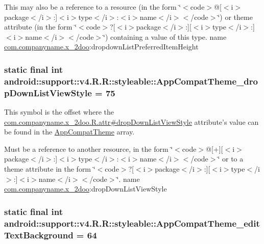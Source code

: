This may also be a reference to a resource (in the form \char`\"{}$<$code$>$@\mbox{[}$<$i$>$package$<$/i$>$:\mbox{]}$<$i$>$type$<$/i$>$:$<$i$>$name$<$/i$>$$<$/code$>$\char`\"{}) or theme attribute (in the form \char`\"{}$<$code$>$?\mbox{[}$<$i$>$package$<$/i$>$:\mbox{]}\mbox{[}$<$i$>$type$<$/i$>$:\mbox{]}$<$i$>$name$<$/i$>$$<$/code$>$\char`\"{}) containing a value of this type.  name \hyperlink{namespacecom_1_1companyname_1_1x__2doo}{com.companyname.x\_\-2doo}:dropdownListPreferredItemHeight \hypertarget{classandroid_1_1support_1_1v4_1_1_r_1_1styleable_7f77b4643b5ac4aa9e62aa4fc9232548}{
\subsubsection[{AppCompatTheme\_\-dropDownListViewStyle}]{\setlength{\rightskip}{0pt plus 5cm}static final int android::support::v4.R.R::styleable::AppCompatTheme\_\-dropDownListViewStyle = 75}}
\label{classandroid_1_1support_1_1v4_1_1_r_1_1styleable_7f77b4643b5ac4aa9e62aa4fc9232548}


This symbol is the offset where the \hyperlink{classcom_1_1companyname_1_1x__2doo_1_1_r_1_1attr_4af8075c171aece6c5ba9ce03299d157}{com.companyname.x\_\-2doo.R.attr\#dropDownListViewStyle} attribute's value can be found in the \hyperlink{classandroid_1_1support_1_1v4_1_1_r_1_1styleable_0873e92ba21076bb5a4aeadeb7f5779f}{AppCompatTheme} array.

Must be a reference to another resource, in the form \char`\"{}$<$code$>$@\mbox{[}+\mbox{]}\mbox{[}$<$i$>$package$<$/i$>$:\mbox{]}$<$i$>$type$<$/i$>$:$<$i$>$name$<$/i$>$$<$/code$>$\char`\"{} or to a theme attribute in the form \char`\"{}$<$code$>$?\mbox{[}$<$i$>$package$<$/i$>$:\mbox{]}\mbox{[}$<$i$>$type$<$/i$>$:\mbox{]}$<$i$>$name$<$/i$>$$<$/code$>$\char`\"{}.  name \hyperlink{namespacecom_1_1companyname_1_1x__2doo}{com.companyname.x\_\-2doo}:dropDownListViewStyle \hypertarget{classandroid_1_1support_1_1v4_1_1_r_1_1styleable_1e59b88c396599d1ced4caa57c2a7264}{
\subsubsection[{AppCompatTheme\_\-editTextBackground}]{\setlength{\rightskip}{0pt plus 5cm}static final int android::support::v4.R.R::styleable::AppCompatTheme\_\-editTextBackground = 64}}
\label{classandroid_1_1support_1_1v4_1_1_r_1_1styleable_1e59b88c396599d1ced4caa57c2a7264}


